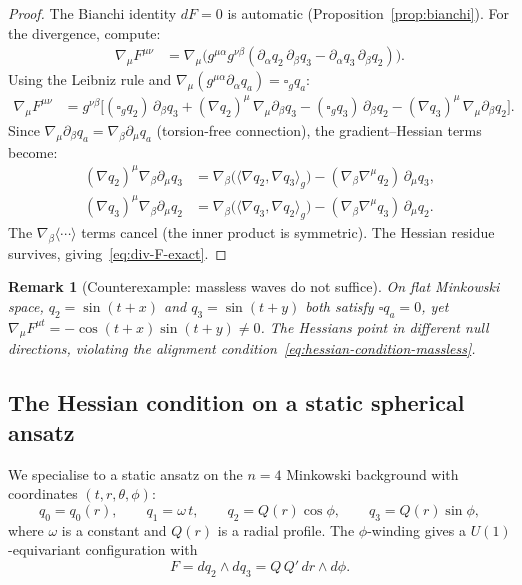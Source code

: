 \documentclass[pdflatex,sn-mathphys-num]{sn-jnl}
\theoremstyle{thmstyleone}%
\theoremstyle{thmstyletwo}%
\newtheorem{remark}[theorem]{Remark}
\theoremstyle{thmstylethree}%
\newcommand{\pa}{\partial}
\newcommand{\nn}{\nabla}
\numberwithin{equation}{section}
\begin{document}
\begin{proof}
The Bianchi identity $dF = 0$ is automatic
(Proposition~\ref{prop:bianchi}).  For the divergence, compute:
\begin{align}
\nn_\mu F^{\mu\nu}
&= \nn_\mu\bigl(g^{\mu\alpha}g^{\nu\beta}
   (\pa_\alpha q_2\,\pa_\beta q_3 - \pa_\alpha q_3\,\pa_\beta q_2)
   \bigr).
  \label{eq:div-F-expand}
\end{align}
Using the Leibniz rule and $\nn_\mu(g^{\mu\alpha}\pa_\alpha q_a)
= \square_g q_a$:
\begin{align}
\nn_\mu F^{\mu\nu}
&= g^{\nu\beta}\bigl[
     (\square_g q_2)\,\pa_\beta q_3
   + (\nn q_2)^\mu\,\nn_\mu\pa_\beta q_3
   - (\square_g q_3)\,\pa_\beta q_2
   - (\nn q_3)^\mu\,\nn_\mu\pa_\beta q_2
   \bigr].
  \label{eq:div-F-leibniz}
\end{align}
Since $\nn_\mu\pa_\beta q_a = \nn_\beta\pa_\mu q_a$ (torsion-free
connection), the gradient--Hessian terms become:
\begin{align*}
(\nn q_2)^\mu\nn_\beta\pa_\mu q_3
&= \nn_\beta\bigl(\langle\nn q_2,\nn q_3\rangle_g\bigr)
   - (\nn_\beta\nn^\mu q_2)\,\pa_\mu q_3, \\
(\nn q_3)^\mu\nn_\beta\pa_\mu q_2
&= \nn_\beta\bigl(\langle\nn q_3,\nn q_2\rangle_g\bigr)
   - (\nn_\beta\nn^\mu q_3)\,\pa_\mu q_2.
\end{align*}
The $\nn_\beta\langle\cdots\rangle$ terms cancel (the inner product
is symmetric).  The Hessian residue survives,
giving~\eqref{eq:div-F-exact}.
\end{proof}

\begin{remark}[Counterexample: massless waves do not suffice]
\label{rem:counterexample}
On flat Minkowski space, $q_2 = \sin(t+x)$ and
$q_3 = \sin(t+y)$ both satisfy $\square q_a = 0$, yet
$\nn_\mu F^{\mu t} = -\cos(t+x)\sin(t+y) \neq 0$.
The Hessians point in different null directions, violating
the alignment condition~\eqref{eq:hessian-condition-massless}.
\end{remark}

\subsection{The Hessian condition on a static spherical ansatz}

We specialise to a static ansatz on the $n=4$ Minkowski background
with coordinates $(t,r,\theta,\phi)$:
\begin{equation}
\label{eq:u1-ansatz}
q_0 = q_0(r), \qquad q_1 = \omega\,t, \qquad
q_2 = Q(r)\cos\phi, \qquad q_3 = Q(r)\sin\phi,
\end{equation}
where $\omega$ is a constant and $Q(r)$ is a radial profile.
The $\phi$-winding gives a $U(1)$-equivariant configuration with
\begin{equation}
\label{eq:F-ansatz}
F = dq_2\wedge dq_3 = Q\,Q'\,dr\wedge d\phi.
\end{equation}
\end{document}
